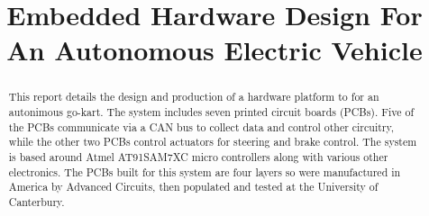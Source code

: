 \title{Embedded Hardware Design For An Autonomous Electric Vehicle}

\author{

  \vspace{0.5\baselineskip}


  \vspace{0.5\baselineskip}


  \vspace{0.5\baselineskip}

}

\maketitle

\begin{abstract}
  This report details the design and production of a hardware platform to for
  an autonimous go-kart. The system includes seven printed circuit boards
  (PCBs).  Five of the PCBs communicate via a CAN bus to collect data and
  control other circuitry, while the other two PCBs control actuators for
  steering and brake control. The system is based around Atmel AT91SAM7XC micro
  controllers along with various other electronics. The PCBs built for this
  system  are four layers so were manufactured in America by Advanced Circuits,
  then populated and tested at the University of Canterbury.
\end{abstract}
